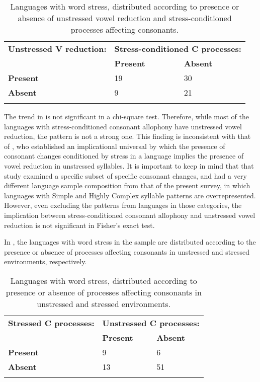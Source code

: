\begin{table}
\begin{tabularx}{\textwidth}{XXX}
\lsptoprule
 \textbf{Unstressed V reduction:} & \multicolumn{2}{c}{ \textbf{Stress-conditioned C processes:}}\\
\hhline{-~~} & \textbf{Present} & \textbf{Absent}\\
 \textbf{Present} & 19 & 30\\
 \textbf{Absent} & 9 & 21\\
\lspbottomrule
\end{tabularx}
\caption{\label{tab:5.8}Languages with word stress, distributed according to presence or absence of unstressed vowel reduction and stress-conditioned processes affecting consonants.}
\end{table}

  The trend in  is not significant in a chi-square test. Therefore, while most of the languages with stress-conditioned consonant allophony have unstressed vowel reduction, the pattern is not a strong one. This finding is inconsistent with that of \citet{BybeeEtAl1998}, who established an implicational universal by which the presence of consonant changes conditioned by stress in a language implies the presence of vowel reduction in unstressed syllables. It is important to keep in mind that that study examined a specific subset of specific consonant changes, and had a very different language sample composition from that of the present survey, in which languages with Simple and Highly Complex syllable patterns are overrepresented. However, even excluding the patterns from languages in those categories, the implication between stress-conditioned consonant allophony and unstressed vowel reduction is not significant in Fisher’s exact test.

   In , the languages with word stress in the sample are distributed according to the presence or absence of processes affecting consonants in unstressed and stressed environments, respectively.

\begin{table}
\begin{tabularx}{\textwidth}{XXX}
\lsptoprule
 \textbf{Stressed C processes:} & \multicolumn{2}{c}{ \textbf{Unstressed C processes:}}\\
\hhline{-~~} & \textbf{Present} & \textbf{Absent}\\
 \textbf{Present} & 9 & 6\\
 \textbf{Absent} & 13 & 51\\
\lspbottomrule
\end{tabularx}
\caption{\label{tab:5.9}Languages with word stress, distributed according to presence or absence of processes affecting consonants in unstressed and stressed environments.}
\end{table}

